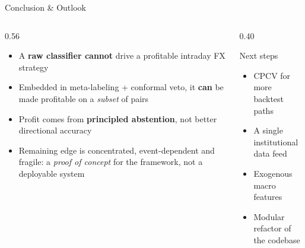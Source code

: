 \documentclass[aspectratio=169, 11pt]{beamer}
\newcommand{\hl}[1]{\textcolor{unibored}{\textbf{#1}}}
\begin{document}
\begin{frame}{Conclusion \& Outlook}
  \begin{columns}[c,onlytextwidth]
    \begin{column}{0.56\textwidth}
      \begin{itemize}
        \setlength{\itemsep}{2mm}
        \item A \textbf{raw classifier cannot} drive a profitable intraday FX strategy
        \item Embedded in meta-labeling + conformal veto, it \textbf{can} be made profitable on a \emph{subset} of pairs
        \item Profit comes from \hl{principled abstention}, not better directional accuracy
        \item Remaining edge is concentrated, event-dependent and fragile:
          a \emph{proof of concept} for the framework, not a deployable system
      \end{itemize}
    \end{column}
    \begin{column}{0.40\textwidth}
      \begin{block}{Next steps}
        \small
        \begin{itemize}
          \setlength{\itemsep}{2mm}
          \item CPCV for more backtest paths
          \item A single institutional data feed
          \item Exogenous macro features
          \item Modular refactor of the codebase
        \end{itemize}
      \end{block}
    \end{column}
  \end{columns}
\end{frame}
\end{document}
